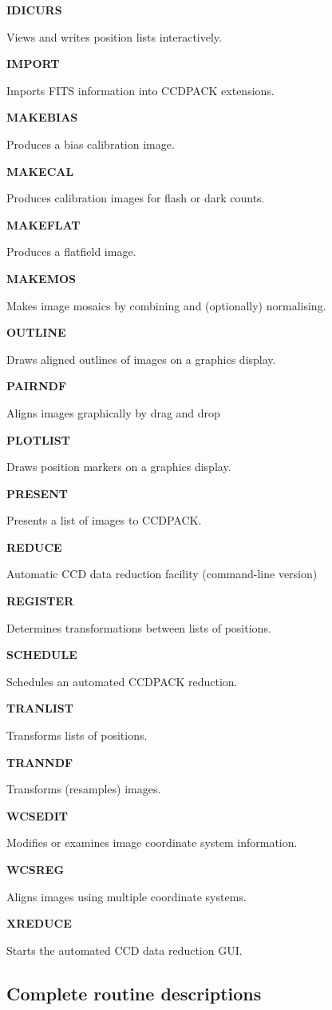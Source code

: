 \documentclass[twoside,11pt]{article}
\newenvironment{latexonly}{}{}
\renewcommand{\_}{\texttt{\symbol{95}}}
\newcommand{\quickdes}[3]{
                         \parbox{1.1in}{\bf #1}
                         \parbox{4.4in}{\raggedright #2 \dotfill}
                         \parbox{0.6in}{\pageref{#3}}
                         \vspace*{0.2in}}
\begin{document}
\begin{latexonly}
\quickdes{IDICURS}{Views and writes position lists interactively.}{IDICURS}

\quickdes{IMPORT}{Imports FITS information into CCDPACK extensions.}{IMPORT}

\quickdes{MAKEBIAS}{Produces a bias calibration image.}{MAKEBIAS}

\quickdes{MAKECAL}{Produces calibration images for flash or dark counts.}
                  {MAKECAL}

\quickdes{MAKEFLAT}{Produces a flatfield image.}
                   {MAKEFLAT}

\quickdes{MAKEMOS}{Makes image mosaics by combining and (optionally) 
                   normalising.}
                  {MAKEMOS}

\quickdes{OUTLINE}{Draws aligned outlines of images on a graphics display.}
                  {OUTLINE}

\quickdes{PAIRNDF}{Aligns images graphically by drag and drop}{PAIRNDF}

\quickdes{PLOTLIST}{Draws position markers on a graphics display.}
                   {PLOTLIST}

\quickdes{PRESENT}{Presents a list of images to CCDPACK.}{PRESENT}

\quickdes{REDUCE}{Automatic CCD data reduction facility (command-line version)}
                 {REDUCE}

\quickdes{REGISTER}{Determines transformations between lists of positions.}
                   {REGISTER}

\quickdes{SCHEDULE}{Schedules an automated CCDPACK reduction.}{SCHEDULE}

\quickdes{TRANLIST}{Transforms lists of positions.}
                   {TRANLIST}

\quickdes{TRANNDF}{Transforms (resamples) images.} {TRANNDF}

\quickdes{WCSEDIT}{Modifies or examines image coordinate system information.}
                  {WCSEDIT}

\quickdes{WCSREG}{Aligns images using multiple coordinate systems.}{WCSREG}

\quickdes{XREDUCE}{Starts the automated CCD data reduction GUI.}{XREDUCE}
\end{latexonly}

\subsection{Complete routine descriptions \label{descriptions}}
\end{document}
